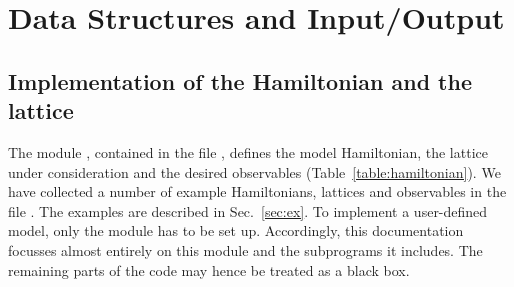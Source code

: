 \documentclass{SciPost}
\begin{document}
\begin{algorithm}[H]
\begin{algorithmic}[1]
\EndIf
\EndFor
\item[]

\EndFor
\item[]

 
\EndIf


\EndFor

 

\EndFor

\end{algorithmic}
\end{algorithm}


%
\section{Data Structures and Input/Output}\label{sec:imp}
%
\subsection{Implementation of the Hamiltonian and the lattice} 
%
The module , contained in the file , defines the model Hamiltonian, the lattice under consideration and the desired observables (Table~\ref{table:hamiltonian}). 
We have collected a number of example Hamiltonians, lattices and observables in the file  .  The examples are described in Sec.~\ref{sec:ex}.
To implement a user-defined model, only the module  has to be set up. Accordingly, this documentation focusses almost entirely  on this module and the subprograms it includes. 
The remaining parts of the code may hence be treated as a black box.  
\end{document}

